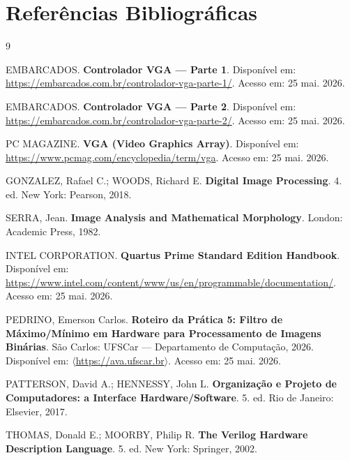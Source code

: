 \documentclass[12pt, a4paper]{article}
\begin{document}
	\section{Referências Bibliográficas}
	
	\begin{thebibliography}{9}
		
		EMBARCADOS.
		\textbf{Controlador VGA --- Parte 1}.
		Disponível em: \url{https://embarcados.com.br/controlador-vga-parte-1/}.
		Acesso em: 25 mai. 2026.
		
		EMBARCADOS.
		\textbf{Controlador VGA --- Parte 2}.
		Disponível em: \url{https://embarcados.com.br/controlador-vga-parte-2/}.
		Acesso em: 25 mai. 2026.
		
		PC MAGAZINE.
		\textbf{VGA (Video Graphics Array)}.
		Disponível em: \url{https://www.pcmag.com/encyclopedia/term/vga}.
		Acesso em: 25 mai. 2026.
		
		GONZALEZ, Rafael C.; WOODS, Richard E.
		\textbf{Digital Image Processing}.
		4. ed. New York: Pearson, 2018.
		
		SERRA, Jean.
		\textbf{Image Analysis and Mathematical Morphology}.
		London: Academic Press, 1982.
		
		INTEL CORPORATION.
		\textbf{Quartus Prime Standard Edition Handbook}.
		Disponível em: \url{https://www.intel.com/content/www/us/en/programmable/documentation/}.
		Acesso em: 25 mai. 2026.
		
		PEDRINO, Emerson Carlos.
		\textbf{Roteiro da Prática 5: Filtro de Máximo/Mínimo em Hardware para
			Processamento de Imagens Binárias}.
		São Carlos: UFSCar --- Departamento de Computação, 2026.
		Disponível em: $\langle$\url{https://ava.ufscar.br}$\rangle$. Acesso em: 25 mai. 2026.
		
		PATTERSON, David A.; HENNESSY, John L.
		\textbf{Organização e Projeto de Computadores: a Interface Hardware/Software}.
		5. ed. Rio de Janeiro: Elsevier, 2017.
		
		THOMAS, Donald E.; MOORBY, Philip R.
		\textbf{The Verilog Hardware Description Language}.
		5. ed. New York: Springer, 2002.
		
	\end{thebibliography}
	
\end{document}

